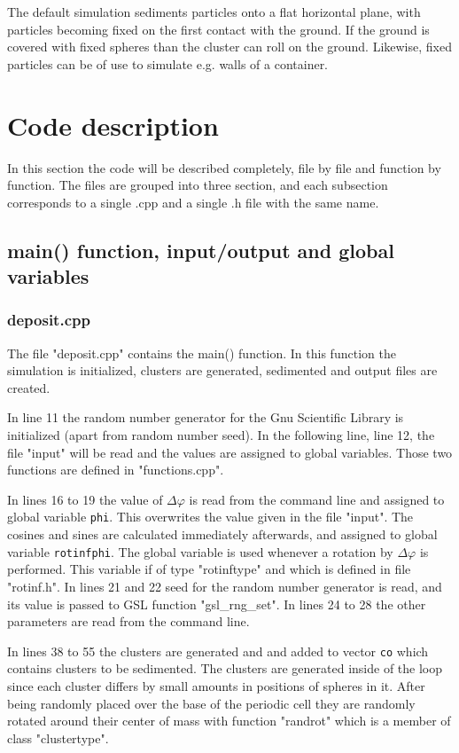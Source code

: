 \documentclass[12pt]{article}
\begin{document}
The default simulation sediments particles onto a flat horizontal plane, with particles becoming fixed on the first contact with the ground. If the ground is covered with fixed spheres than the cluster can roll on the ground. Likewise, fixed particles can be of use to simulate e.g. walls of a container.

\section{Code description}
In this section the code will be described completely, file by file and function by function. The files are grouped into three section, and each subsection corresponds to a single .cpp and a single .h file with the same name.
\subsection{main() function, input/output and global variables}
\subsubsection{deposit.cpp}
The file "deposit.cpp" contains the main() function. In this function the simulation is initialized, clusters are generated, sedimented and output files are created.

In line 11 the random number generator for the Gnu Scientific Library is initialized (apart from random number seed). In the following line, line 12, the file "input" will be read and the values are assigned to global variables. Those two functions are defined in "functions.cpp".

In lines 16 to 19 the value of $\Delta\varphi$ is read from the command line and assigned to global variable \texttt{phi}. This overwrites the value given in the file "input". The cosines and sines are calculated immediately afterwards, and assigned to global variable \texttt{rotinfphi}. The global variable is used whenever a rotation by $\Delta\varphi$ is performed. This variable if of type "rotinftype" and which is defined in file "rotinf.h". In lines 21 and 22 seed for the random number generator is read, and its value is passed to GSL function "gsl\_rng\_set". In lines 24 to 28 the other parameters are read from the command line.  

In lines 38 to 55 the clusters are generated and and added to vector \texttt{co} which contains clusters to  be sedimented. The clusters are generated inside of the loop since each cluster differs by small amounts in positions of spheres in it. After being randomly placed over the base of the periodic cell they are randomly rotated around their center of mass with function "randrot" which is a member of class "clustertype".
\end{document}
